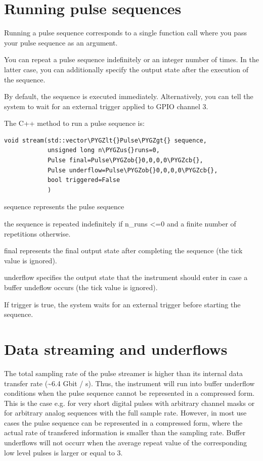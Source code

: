 \documentclass[letterpaper,10pt,english]{sphinxmanual}
\def\PYGZus{\char`\_}
\def\PYGZob{\char`\{}
\def\PYGZcb{\char`\}}
\def\PYGZlt{\char`\<}
\def\PYGZgt{\char`\>}
\begin{document}
\section{Running pulse sequences}
\label{sections/interface:running-pulse-sequences}
Running a pulse sequence corresponds to a single function call where you
pass your pulse sequence as an argument.

You can repeat a pulse sequence indefinitely or an integer number of times.
In the latter case, you can additionally specify the output state after the
execution of the sequence.

By default, the sequence is executed immediately. Alternatively, you can
tell the system to wait for an external trigger applied to GPIO channel 3.

The C++ method to run a pulse sequence is:

\begin{Verbatim}[commandchars=\\\{\}]
void stream(std::vector\PYGZlt{}Pulse\PYGZgt{} sequence,
            unsigned long n\PYGZus{}runs=0,
            Pulse final=Pulse\PYGZob{}0,0,0,0\PYGZcb{},
            Pulse underflow=Pulse\PYGZob{}0,0,0,0\PYGZcb{},
            bool triggered=False
            )
\end{Verbatim}

sequence represents the pulse sequence

the sequence is repeated indefinitely if n\_runs \textless{}=0 and a finite number of repetitions otherwise.

final represents the final output state after completing the sequence (the tick value is ignored).

underflow specifies the output state that the instrument should enter in case a buffer undeflow occurs (the tick value is ignored).

If trigger is true, the system waits for an external trigger before starting the sequence.


\section{Data streaming and underflows}
\label{sections/interface:data-streaming-and-underflows}
The total sampling rate of the pulse streamer is higher than its internal data transfer rate (\textasciitilde{}6.4 Gbit / s).
Thus, the instrument will run into buffer underflow conditions when the pulse sequence cannot be represented
in a compressed form. This is the case e.g. for very short digital pulses with arbitrary channel masks
or for arbitrary analog sequences with the full sample rate.
However, in most use cases the pulse sequence can be represented in a compressed form, where the
actual rate of transfered information is smaller than the sampling rate.
Buffer underflows will not occurr when the average repeat value of the corresponding low level pulses is
larger or equal to 3.
\end{document}
